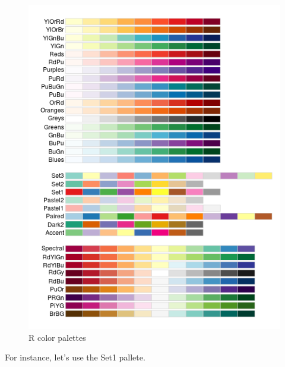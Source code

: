 \documentclass[]{tufte-book}
\begin{document}
\begin{figure}
\centering
\includegraphics{images/brewer-pal.png}
\caption{R color palettes}
\end{figure}

For instance, let's use the Set1 pallete.
\end{document}

